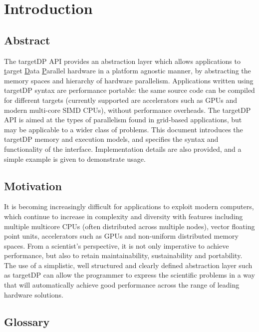 
\chapter{Introduction}

\section{Abstract}

The targetDP API provides an abstraction layer which allows
applications to \underline{t}arget \underline{D}ata
\underline{P}arallel hardware in a platform agnostic manner, by
abstracting the memory spaces and hierarchy of hardware
parallelism. Applications written using targetDP syntax are
performance portable: the same source code can be compiled for
different targets (currently supported are accelerators such as GPUs
and modern multi-core SIMD CPUs), without performance overheads. The
targetDP API is aimed at the types of parallelism found in grid-based
applications, but may be applicable to a wider class of problems. This
document introduces the targetDP memory and execution models, and
specifies the syntax and functionality of the
interface. Implementation details are also provided, and a simple
example is given to demonstrate usage.

\section{Motivation}
It is becoming increasingly difficult for applications to exploit
modern computers, which continue to increase in complexity and
diversity with features including multiple multicore CPUs (often
distributed across multiple nodes), vector floating point units,
accelerators such as GPUs and non-uniform distributed memory spaces.
From a scientist's perspective, it is not only imperative to achieve
performance, but also to retain maintainability, sustainability and
portability. The use of a simplistic, well structured and clearly
defined abstraction layer such as targetDP can allow the programmer to
express the scientific problems in a way that will automatically
achieve good performance across the range of leading hardware
solutions.

\section{Glossary}

